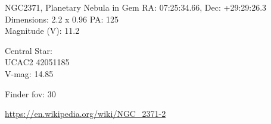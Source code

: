 \begin{block}{NGC2371, Planetary Nebula in Gem}
    RA: 07:25:34.66, Dec: +29:29:26.3 \\ 
    Dimensions: 2.2 x 0.96 PA: 125 \\ 
    Magnitude (V): 11.2


    Central Star: \\ 
      \hspace{1em}UCAC2 42051185 \\ 
      \hspace{1em}V-mag: 14.85 


    Finder fov: 30 

    \url{https://en.wikipedia.org/wiki/NGC_2371-2} 
\end{block}